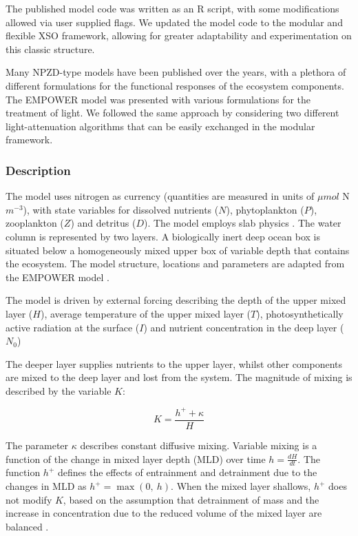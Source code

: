 \documentclass[journal abbreviation, manuscript]{copernicus}
\begin{document}
The published model code was written as an R script, with some modifications allowed via user supplied flags. We updated the model code to the modular and flexible XSO framework, allowing for greater adaptability and experimentation on this classic structure.

Many NPZD-type models have been published over the years, with a plethora of different formulations for the functional responses of the ecosystem components. The EMPOWER model was presented with various formulations for the treatment of light. We followed the same approach by considering two different light-attenuation algorithms that can be easily exchanged in the modular framework.

\subsubsection{Description}
The model uses nitrogen as currency (quantities are measured in units of $\mu mol$ N $m^{-3}$), with state variables for dissolved nutrients ($N$), phytoplankton ($P$), zooplankton ($Z$) and detritus ($D$). The model employs slab physics \citep{Evans1985ACycles}. The water column is represented by  two layers. A biologically inert deep ocean box is situated below a homogeneously mixed upper box of variable depth that contains the ecosystem. The model structure, locations and parameters are adapted from the EMPOWER model \citep{Anderson2015c}.

The model is driven by external forcing describing the depth of the upper mixed layer ($H$), average temperature of the upper mixed layer ($T$), photosynthetically active radiation at the surface ($I$) and nutrient concentration in the deep layer ($N_0$) 

The deeper layer supplies nutrients to the upper layer, whilst other components are mixed to the deep layer and lost from the system.
The magnitude of mixing is described by the variable $K$:

\begin{equation}
    K = \frac{h^{+} + \kappa}{H}
\end{equation}

The parameter $\kappa$ describes constant diffusive mixing. Variable mixing is a function of the change in mixed layer depth (MLD) over time $h = \frac{dH}{dt}$. The function $h^{+}$ defines the effects of entrainment and detrainment due to the changes in MLD as $h^{+} = \max(0, \ h)$. When the mixed layer shallows, $h^{+}$ does not modify $K$, based on the assumption that detrainment of mass and the increase in concentration due to the reduced volume of the mixed layer are balanced \citep{Evans1985ACycles}. 
\end{document}
